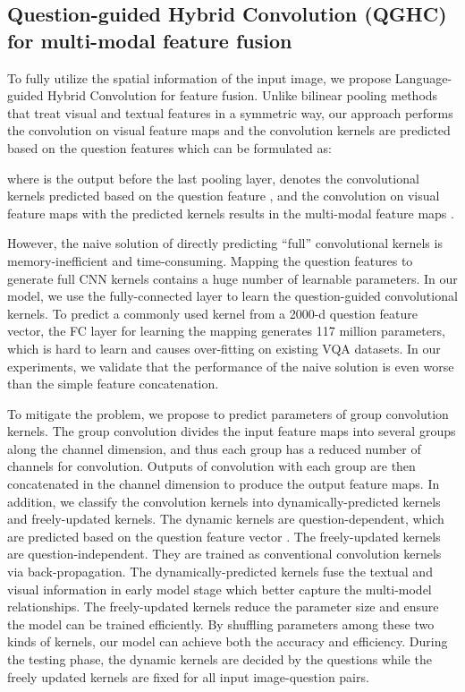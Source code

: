 \documentclass[runningheads]{llncs}
\begin{document}
\subsection{Question-guided Hybrid Convolution (QGHC) for multi-modal feature fusion}
\label{sec:problem1}

To fully utilize the spatial information of the input image, we propose Language-guided Hybrid Convolution for feature fusion. Unlike bilinear pooling methods that treat visual and textual features in a symmetric way, our approach performs the convolution on visual feature maps and the convolution kernels are predicted based on the question features which can be formulated as:

where  is the output before the last pooling layer,  denotes the convolutional kernels predicted based on the question feature , and the convolution on visual feature maps with the predicted kernels  results in the multi-modal feature maps .

However, the naive solution of directly predicting ``full'' convolutional kernels is memory-inefficient and time-consuming. Mapping the question features to generate full CNN kernels contains a huge number of learnable parameters. In our model, we use the fully-connected layer to learn the question-guided convolutional kernels. To predict a commonly used  kernel from a 2000-d question feature vector, the FC layer for learning the mapping generates 117 million parameters, which is hard to learn and causes over-fitting on existing VQA datasets. In our experiments, we validate that the performance of the naive solution is even worse than the simple feature concatenation.

To mitigate the problem, we propose to predict parameters of group convolution kernels. The group convolution divides the input feature maps into several groups along the channel dimension, and thus each group has a reduced number of channels for convolution. Outputs of convolution with each group are then concatenated in the channel dimension to produce the output feature maps. In addition, we classify the convolution kernels into dynamically-predicted kernels and freely-updated kernels. The dynamic kernels are question-dependent, which are predicted based on the question feature vector . The freely-updated kernels are question-independent. They are trained as conventional convolution kernels via back-propagation. The dynamically-predicted kernels fuse the textual and visual information in early model stage which better capture the multi-model relationships. The freely-updated kernels reduce the parameter size and ensure the model can be trained efficiently. By shuffling parameters among these two kinds of kernels, our model can achieve both the accuracy and efficiency.
During the testing phase, the dynamic kernels are decided by the questions while the freely updated kernels are fixed for all input image-question pairs.
\end{document}
